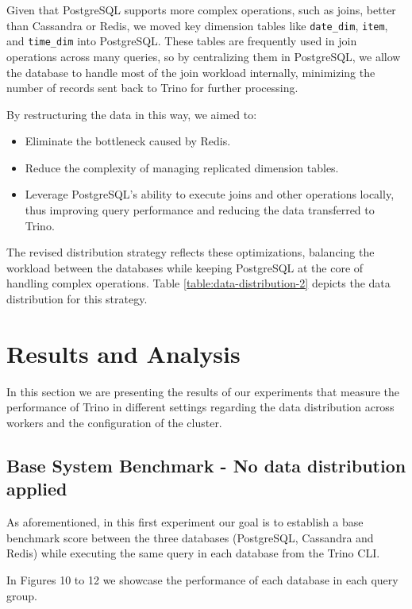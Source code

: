 \documentclass[conference]{IEEEtran}
\begin{document}
Given that PostgreSQL supports more complex operations, such as joins, better than Cassandra or Redis,
we moved key dimension tables like \texttt{date\_dim}, \texttt{item}, and \texttt{time\_dim} into PostgreSQL.
These tables are frequently used in join operations across many queries, so by centralizing them in PostgreSQL,
we allow the database to handle most of the join workload internally, minimizing the number of records sent
back to Trino for further processing.

By restructuring the data in this way, we aimed to:
\begin{itemize}
	\item Eliminate the bottleneck caused by Redis.
	\item Reduce the complexity of managing replicated dimension tables.
	\item Leverage PostgreSQL’s ability to execute joins and other operations locally, thus improving query
	      performance and reducing the data transferred to Trino.
\end{itemize}

The revised distribution strategy reflects these optimizations, balancing the workload between the databases
while keeping PostgreSQL at the core of handling complex operations.
Table \ref{table:data-distribution-2} depicts the data distribution for this strategy.

\section{Results and Analysis}

In this section we are presenting the results of our experiments that measure the performance of Trino in different settings regarding the data distribution across workers and the configuration of the cluster.

\subsection{Base System Benchmark - No data distribution applied}
\label{sec:no-data-distribution}

As aforementioned, in this first experiment our goal is to establish a base benchmark score between the three databases (PostgreSQL, Cassandra and Redis) while executing the same query in each database from the Trino CLI.

In Figures 10 to 12 we showcase the performance of each database in each query group.
\end{document}
